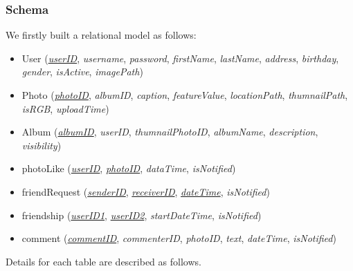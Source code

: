 \documentclass[10pt,twocolumn,letterpaper]{article}
\begin{document}
\subsubsection{Schema}
We firstly built a relational model as follows:
\begin{itemize}
	\item User (\emph{\underline{userID}}, \emph{username}, \emph{password}, \emph{firstName}, \emph{lastName}, \emph{address}, \emph{birthday}, \emph{gender}, \emph{isActive}, \emph{imagePath})

	\item Photo (\emph{\underline{photoID}}, \emph{albumID}, \emph{caption}, \emph{featureValue}, \emph{locationPath}, \emph{thumnailPath}, \emph{isRGB}, \emph{uploadTime})

	\item Album (\emph{\underline{albumID}}, \emph{userID}, \emph{thumnailPhotoID}, \emph{albumName}, \emph{description}, \emph{visibility})

	\item photoLike (\emph{\underline{userID}}, \emph{\underline{photoID}}, \emph{dataTime}, \emph{isNotified})

	\item friendRequest (\emph{\underline{senderID}}, \emph{\underline{receiverID}}, \emph{\underline{dateTime}}, \emph{isNotified})

	\item friendship (\emph{\underline{userID1}}, \emph{\underline{userID2}}, \emph{startDateTime}, \emph{isNotified})

	\item comment (\emph{\underline{commentID}}, \emph{commenterID}, \emph{photoID}, \emph{text}, \emph{dateTime}, \emph{isNotified})
\end{itemize}

Details for each table are described as follows.
\end{document}
